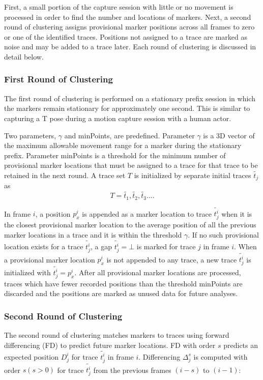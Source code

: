 First, a small portion of the capture session with little or no movement is processed in order to find the number and locations of markers. Next, a second round of clustering assigns provisional marker positions across all frames to zero or one of the identified traces.  Positions not assigned to a trace are marked as noise and may be added to a trace later.  Each round of clustering is discussed in detail below.  

\subsubsection{First Round of Clustering}
The first round of clustering is performed on a stationary prefix session in which the markers remain stationary for approximately one second. This is similar to capturing a T pose during a motion capture session with a human actor.  

Two parameters, $\gamma$ and minPoints, are predefined. Parameter $\gamma$ is a 3D vector of the maximum allowable movement range for a marker during the stationary prefix.   Parameter minPoints is a threshold for the minimum number of provisional marker locations that must be assigned to a trace for that trace to be retained in the next round. A trace set $T$ is initialized by separate initial traces $\tilde{t_j}$ as 
\[
T={\tilde{t_1},\tilde{t_2},\tilde{t_3}...}. 
\]

In frame $i$, a position $p_x^i$ is appended as a marker location to trace $\tilde{t_j^i}$ when it is the closest provisional marker location to the average position of all the previous marker locations in a trace and it is within the threshold $\gamma$. If no such provisional location exists for a trace $\tilde{t_j^i}$, a gap $\tilde{t_j^i}=\bot{}$ is marked for trace $j$ in frame $i$. When a provisional marker location $p_x^i$ is not appended to any trace, a new trace $\tilde{t_j^i}$ is initialized with $\tilde{t_j^i}=p_x^i$. After all provisional marker locations are processed, traces which have fewer recorded positions than the threshold minPoints are discarded and the positions are marked as unused data for future analyses. 

\subsubsection{Second Round of Clustering}

The second round of clustering matches markers to traces using forward differencing (FD) to predict future marker locations. FD with order $s$ predicts an expected position $D_j^i$ for trace $\tilde{t_j^i}$ in frame $i$. Differencing $\Delta_j^s$ is computed with order $s(s>0)$ for trace $\tilde{t_j^i}$ from the previous frames $(i-s)$ to $(i-1)$:

